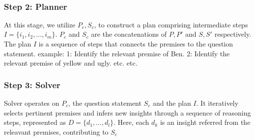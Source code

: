 \documentclass[10pt,a4paper]{article}
\begin{document}
\begin{multicols}{2}

\\

\subsubsection*{Step 2: Planner}

At this stage, we utilize $P_c, S_c$, to construct a plan comprising intermediate steps $I = \{ i_1, i_2, \dots, i_m\}$. $P_c$ and $S_c$ are the concatenations of $P, P'$ and $S, S'$ respectively. The plan $I$ is a sequence of steps that connects the premises to the question statement. example: 1: Identify the relevant premise of Ben. 2: Identify the relevant premise of yellow and ugly. etc. etc.

\subsubsection*{Step 3: Solver}

Solver operates on $P_c$, the question statement $S_c$ and the plan $I$.  It iteratively
selects pertinent premises and infers new insights
through a sequence of reasoning steps, represented
as $D = \{ d_1, \dots, d_l\}$. Here, each $d_k$ is an insight referred from the releavant premises, contributing to $S_c$


\end{multicols}
\end{document}
